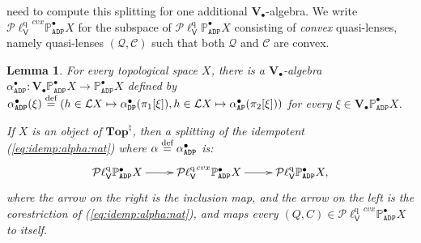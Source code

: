 \documentclass[preprint,12pt]{elsarticle}
\newcommand\eqdef{\mathrel{\buildrel \text{def}\over=}}
\newcommand\Lform{\mathcal L}
\newcommand\Pred{\mathbb{P}}
\newcommand\Angel{{\mathtt{A}}}
\newcommand\Demon{{\mathtt{D}}}
\newcommand\Nature{{\mathtt{P}}}
\newcommand\AN{{\Angel\Nature}}
\newcommand\DN{{\Demon\Nature}}
\newcommand\ADN{{\Angel\Demon\Nature}}
\newcommand\Vt{\mathsf{V}}
\newcommand\quasi{\mathrm{q}} %
\newcommand\QL{\Plotkin^\quasi}
\newcommand\QLV{\QL_\Vt}
\newcommand\Plotkin{\mathcal P\ell} %
\newcommand\Val{{\mathbf V}}
\newcommand\Topcat{\mathbf{Top}}
\newtheorem{lemma}[theorem]{Lemma}
\begin{document}
need to compute this splitting for one additional
$\Val_\bullet$-algebra.  We write
${\QLV}^{cvx} {\Pred_\ADN^\bullet X}$ for the subspace of
$\QLV {\Pred_\ADN^\bullet X}$ consisting of \emph{convex}
quasi-lenses, namely quasi-lenses $(\mathcal Q, \mathcal C)$ such that
both $\mathcal Q$ and $\mathcal C$ are convex.
\begin{lemma}
  \label{lemma:idemp:P:nat}
  For every topological space $X$, there is a $\Val_\bullet$-algebra
  $\alpha_\ADN^\bullet \colon \Val_\bullet {\Pred_\ADN^\bullet X} \to
  \Pred_\ADN^\bullet X$ defined by
  $\alpha_\ADN^\bullet (\xi) \eqdef (h \in \Lform X \mapsto
  \alpha_\DN^\bullet (\pi_1 [\xi]), h \in \Lform X \mapsto
  \alpha_\AN^\bullet (\pi_2 [\xi]))$ for every
  $\xi \in \Val_\bullet {\Pred_\ADN^\bullet X}$.

  If $X$ is an object of $\Topcat^\natural$, then a splitting of the
  idempotent (\ref{eq:idemp:alpha:nat}) where
  $\alpha \eqdef \alpha_\ADN^\bullet$ is:
  \begin{align*}
    \xymatrix{
    \QLV {\Pred_\ADN^\bullet X} \ar[r]
    & {\QLV}^{cvx} {\Pred_\ADN^\bullet X} \ar[r]
    & \QLV {\Pred_\ADN^\bullet X,}}
  \end{align*}
  where the arrow on the right is the inclusion map, and the arrow on
  the left is the corestriction of (\ref{eq:idemp:alpha:nat}), and
  maps every $(Q, C) \in {\QLV}^{cvx} {\Pred_\ADN^\bullet X}$ to
  itself.
\end{lemma}
\end{document}

